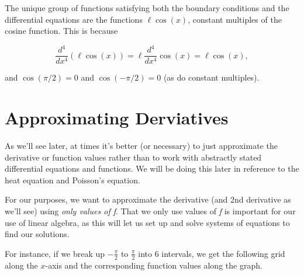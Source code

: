 \documentclass{ximera}
\begin{document}
The unique group of functions satisfying both the boundary conditions and the differential equations are the functions $\ell\cos(x)$, constant multiples of the cosine function. This is because 

$$\frac{d^4}{dx^4}\left(\ell\cos(x)\right)=\ell\frac{d^4}{dx^4}\cos(x)=\ell\cos(x),$$

and $\cos(\pi/2)=0$ and $\cos(-\pi/2)=0$ (as do constant multiples).

\section{Approximating Derviatives}

As we'll see later, at times it's better (or necessary) to just approximate the derivative or function values rather than to work with abstractly stated differential equations and functions. We will be doing this later in reference to the heat equation and Poisson's equation. 

For our purposes, we want to approximate the derivative (and 2nd derivative as we'll see) using \emph{only values of f}. That we only use values of \emph{f} is important for our use of linear algebra, as this will let us set up and solve systems of equations to find our solutions.

For instance, if we break up $-\frac{\pi}{2}$ to $\frac{\pi}{2}$ into 6 intervals, we get the following grid along the $x$-axis and the corresponding function values along the graph.

\end{document}
